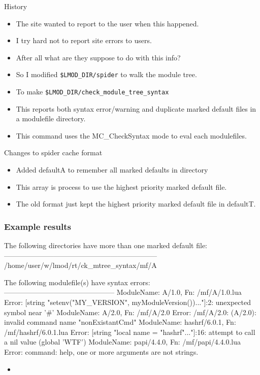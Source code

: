 \documentclass{beamer}
\begin{document}
\begin{frame}{History}
  \begin{itemize}
    \item The site wanted to report to the user when this happened.
    \item I try hard not to report site errors to users.
    \item After all what are they suppose to do with this info?
    \item So I modified \texttt{\$LMOD\_DIR/spider} to walk the module
      tree.
    \item To make \texttt{\$LMOD\_DIR/check\_module\_tree\_syntax}
    \item This reports both syntax error/warning and duplicate marked
      default files in a modulefile directory.
    \item This command uses the MC\_CheckSyntax mode to eval each modulefiles.
  \end{itemize}
\end{frame}

\begin{frame}{Changes to spider cache format}
  \begin{itemize}
    \item Added defaultA to remember all marked defaults in directory
    \item This array is process to use the highest priority marked
      default file.
    \item The old format just kept the highest priority marked default
      file in defaultT.
  \end{itemize}
\end{frame}

\begin{frame}[fragile]
    \frametitle{Example results}
 {\tiny
    \begin{semiverbatim}
The following directories have more than one marked default file:
-----------------------------------------------------------------
  /home/user/w/lmod/rt/ck_mtree_syntax/mf/A


The following modulefile(s) have syntax errors:
-----------------------------------------------
  ModuleName: A/1.0, Fn: /mf/A/1.0.lua 
     Error: [string "setenv("MY_VERSION", myModuleVersion())..."]:2: unexpected symbol near '#' 
  ModuleName: A/2.0, Fn: /mf/A/2.0 
     Error: /mf/A/2.0: (A/2.0): invalid command name "nonExistantCmd"
  ModuleName: hashrf/6.0.1, Fn: /mf/hashrf/6.0.1.lua 
     Error: [string "local name = "hashrf"..."]:16: attempt to call a nil value (global 'WTF') 
  ModuleName: papi/4.4.0, Fn: /mf/papi/4.4.0.lua 
     Error: command: help, one or more arguments are not strings. 
    \end{semiverbatim}
}
  \begin{itemize}
    \item
  \end{itemize}

\end{frame}
\end{document}
